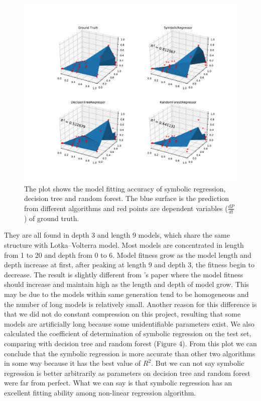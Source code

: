 \documentclass[11pt,a4paper]{article}
\begin{document}
\begin{figure}[h!]
\centering
\includegraphics[scale = 0.52]{../Results/gp_vs_rf_dt.pdf}
\caption{The plot shows the model fitting accuracy of symbolic regression, decision tree and random forest. The blue surface is the prediction from different algorithms and red points are dependent variables ($\frac{dP}{dt}$) of ground truth.}
\end{figure}
They are all found in depth 3 and length 9 models, which share the same structure with Lotka–Volterra model. Most models are concentrated in length from 1 to 20 and depth from 0 to 6. Model fitness grow as the model length and depth increase at first, after peaking at length 9 and depth 3, the fitness begin to decrease. The result is slightly different from \citeauthor{BenjaminT.MartinStephanB.Munch2018}'s paper where the model fitness should increase and maintain high as the length and depth of model grow. This may be due to the models within same generation tend to be homogeneous and the number of long models is relatively small. Another reason for this difference is that we did not do constant compression \citep{BenjaminT.MartinStephanB.Munch2018} on this project, resulting that some models are 
artificially long because some unidentifiable parameters exist.  
We also calculated the coefficient of determination of symbolic regression on the test set, comparing with decision tree and random forest (Figure 4). From this plot we can conclude that the symbolic regression is more accurate than other two algorithms in some way because it has the best value of $R^{2}$. But we can not say symbolic regression is better arbitrarily as parameters on decision tree and random forest were far from perfect. What we can say is that symbolic regression has an excellent fitting ability among non-linear regression algorithm.
\end{document}
